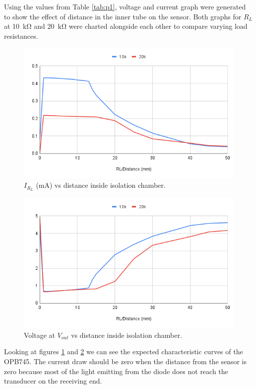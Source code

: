 \documentclass[CMPE]{../KGCOEReport}
\begin{document}
	Using the values from Table \ref{tab:p1}, voltage and current graph were generated
	to show the effect of distance in the inner tube on the sensor. Both graphs for $R_L$
	at \SI{10}{\kilo\ohm} and \SI{20}{\kilo\ohm} were charted alongside each other to
	compare varying load resistances.

	\begin{figure}[h!]
        \centering
        \includegraphics[width=12cm]{irl}
        \caption{$I_{R_L}$ (mA) vs distance inside isolation chamber.}
        \label{fig:irl}
	\end{figure}

	\begin{figure}[h!]
        \centering
        \includegraphics[width=12cm]{vout}
        \caption{Voltage at $V_{out}$ vs distance inside isolation chamber.}
        \label{fig:vout}
	\end{figure}

	Looking at figures \ref{fig:irl} and \ref{fig:vout} we can see the expected
	characteristic curves of the OPB745. The current draw should be zero when the
	distance from the sensor is zero because most of the light emitting from the
	diode does not reach the transducer on the receiving end.
\end{document}
